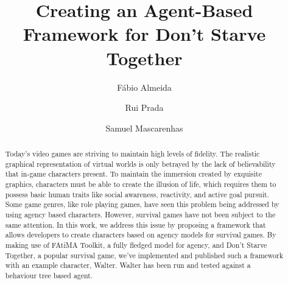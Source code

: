 \documentclass[sigchi]{acmart}
\begin{document}
\title{Creating an Agent-Based Framework for Don't Starve Together}


\author{Fábio Almeida}

\author{Rui Prada}

\author{Samuel Mascarenhas}

\renewcommand{\shortauthors}{}

\begin{abstract}
Today's video games are striving to maintain high levels of fidelity.
The realistic graphical representation of virtual worlds is only betrayed by the lack of believability that in-game characters present.
To maintain the immersion created by exquisite graphics, characters must be able to create the illusion of life, which requires them to possess basic human traits like social awareness, reactivity, and active goal pursuit.
Some game genres, like role playing games, have seen this problem being addressed by using agency based characters.
However, survival games have not been subject to the same attention.
In this work, we address this issue by proposing a framework that allows developers to create characters based on agency models for survival games.
By making use of FAtiMA Toolkit, a fully fledged model for agency, and Don't Starve Together, a popular survival game, we've implemented and published such a framework with an example character, Walter.
Walter has been run and tested against a behaviour tree based agent.
\end{abstract}



\maketitle





\end{document}
